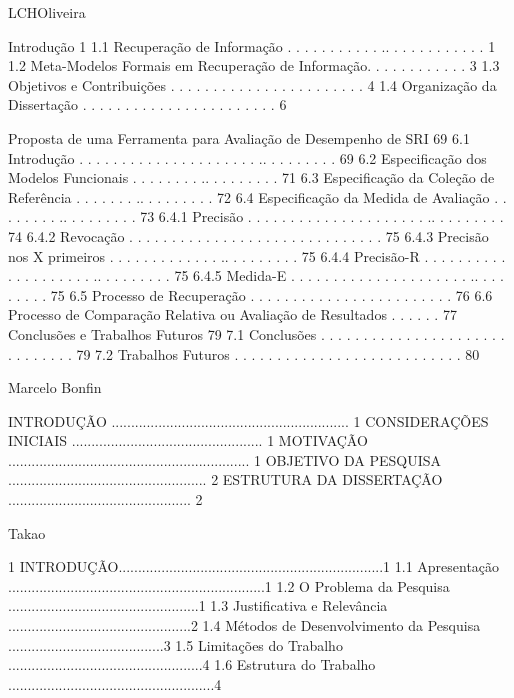 LCHOliveira

Introdução 1
1.1 Recuperação de Informação . . . . . . . . . . . .. . . . . . . . . . . . 1
1.2 Meta-Modelos Formais em Recuperação de Informação. . . . . . . . . . . . 3
1.3 Objetivos e Contribuições  . . . . . . . . . . . . . . . . . . . . . . . 4
1.4 Organização da Dissertação . . . . . . . . . . . . . . . . . . . . . . . 6

Proposta de uma Ferramenta para Avaliação de Desempenho de SRI 69
6.1 Introdução . . . . . . . . . . . . . . . . . . . . . .. . . . . . . . . 69
6.2 Especificação dos Modelos Funcionais . . . . . . . . .. . . . . . . . . 71
6.3 Especificação da Coleção de Referência . . . . . . . .. . . . . . . . . 72
6.4 Especificação da Medida de Avaliação . . . . . . . . .. . . . . . . . . 73
6.4.1 Precisão . . . . . . . . . . . . . . . . . . . . . .. . . . . . . . . 74
6.4.2 Revocação . . . . . . . . . . . . . . . . . . . . . . . . . . . . . . 75
6.4.3 Precisão nos X primeiros . . . . . . . . . . . . . .. . . . . . . . . 75
6.4.4 Precisão-R . . . . . . . . . . . . . . . . . . . . .. . . . . . . . . 75
6.4.5 Medida-E . . . . . . . . . . . . . . . . . . . . . .. . . . . . . . . 75
6.5 Processo de Recuperação . . . . . . . . . . . . . . . . . . . . . . . . 76
6.6 Processo de Comparação Relativa ou Avaliação de Resultados  . . . . . . 77
Conclusões e Trabalhos Futuros 79
7.1 Conclusões . . . . . . . . . . . . . . . . . . . . . . . .  . . . . . . 79
7.2 Trabalhos Futuros . . . . . . . . . . . . . . . . . . . . . . . . . . . 80




Marcelo Bonfin

INTRODUÇÃO ............................................................. 1
CONSIDERAÇÕES INICIAIS ................................................. 1
MOTIVAÇÃO .............................................................. 1
OBJETIVO DA PESQUISA ................................................... 2
ESTRUTURA DA DISSERTAÇÃO ............................................... 2





Takao

1 INTRODUÇÃO....................................................................1
1.1 Apresentação ..................................................................1
1.2 O Problema da Pesquisa .................................................1
1.3 Justificativa e Relevância ...............................................2
1.4 Métodos de Desenvolvimento da Pesquisa ........................................3
1.5 Limitações do Trabalho ..................................................4
1.6 Estrutura do Trabalho .....................................................4





